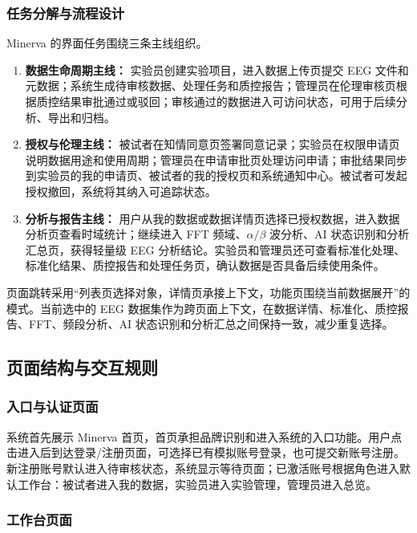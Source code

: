 \subsubsection{任务分解与流程设计}

Minerva 的界面任务围绕三条主线组织。

\begin{enumerate}
  \item \textbf{数据生命周期主线：} 实验员创建实验项目，进入数据上传页提交 EEG 文件和元数据；系统生成待审核数据、处理任务和质控报告；管理员在伦理审核页根据质控结果审批通过或驳回；审核通过的数据进入可访问状态，可用于后续分析、导出和归档。
  \item \textbf{授权与伦理主线：} 被试者在知情同意页签署同意记录；实验员在权限申请页说明数据用途和使用周期；管理员在申请审批页处理访问申请；审批结果同步到实验员的我的申请页、被试者的我的授权页和系统通知中心。被试者可发起授权撤回，系统将其纳入可追踪状态。
  \item \textbf{分析与报告主线：} 用户从我的数据或数据详情页选择已授权数据，进入数据分析页查看时域统计；继续进入 FFT 频域、$\alpha/\beta$ 波分析、AI 状态识别和分析汇总页，获得轻量级 EEG 分析结论。实验员和管理员还可查看标准化处理、标准化结果、质控报告和处理任务页，确认数据是否具备后续使用条件。
\end{enumerate}

页面跳转采用``列表页选择对象，详情页承接上下文，功能页围绕当前数据展开''的模式。当前选中的 EEG 数据集作为跨页面上下文，在数据详情、标准化、质控报告、FFT、频段分析、AI 状态识别和分析汇总之间保持一致，减少重复选择。

\subsection{页面结构与交互规则}

\subsubsection{入口与认证页面}

系统首先展示 Minerva 首页，首页承担品牌识别和进入系统的入口功能。用户点击进入后到达登录/注册页面，可选择已有模拟账号登录，也可提交新账号注册。新注册账号默认进入待审核状态，系统显示等待页面；已激活账号根据角色进入默认工作台：被试者进入我的数据，实验员进入实验管理，管理员进入总览。

\subsubsection{工作台页面}

